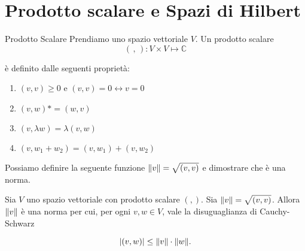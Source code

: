 \chapter{Prodotto scalare e Spazi di Hilbert}

\begin{definition}{Prodotto Scalare}
\label{prod_scal}
Prendiamo uno spazio vettoriale $V$. Un prodotto scalare 
\begin{equation*}
(\,,\,):V \times V \longmapsto \mathbb{C}
\end{equation*}  

è definito dalle seguenti proprietà:
\begin{enumerate}
\item $(v,v) \geq 0$ e $(v,v) = 0 \leftrightarrow v = 0$
\item $(v,w)*=(w,v)$
\item $(v,\lambda w) = \lambda(v,w)$
\item $(v,w_1+w_2) = (v,w_1) + (v,w_2)$
\end{enumerate} 

\end{definition}

Possiamo definire la seguente funzione ${\|v\|}  = \sqrt{(v,v)}$ e dimostrare
che è una norma.

\begin{theorem}\label{th: dis_sch}
Sia $V$ uno spazio vettoriale con prodotto scalare $(,)$.
Sia ${\|v\|} = \sqrt{(v,v)}$. Allora ${\|v\|}$ è una norma per cui,
per ogni $v,w \in V$, vale la disuguaglianza di Cauchy-Schwarz 
\begin{equation}\label{eq: dis_sch}
{\left|(v,w)\right|} \leq {\|v\|} \cdot {\|w\|}.
\end{equation} 
\end{theorem}

